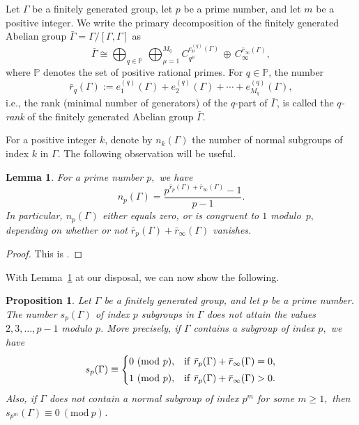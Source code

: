 \documentclass[12pt,reqno]{amsart}
\numberwithin{equation}{section}
\newtheorem{proposition}[theorem]{Proposition}
\newtheorem{lemma}[theorem]{Lemma}
\theoremstyle{remark}
\begin{document}
\medskip
Let $\Gamma$ be a finitely generated group, let $p$
be a prime number, and let $m$ be a positive integer. We write the
primary decomposition of the finitely generated Abelian group
$\bar{\Gamma} = \Gamma/[\Gamma, \Gamma]$ as 
\[
\bar{\Gamma} \cong \bigoplus_{q\in\mathbb{P}}\,
\bigoplus_{\mu=1}^{M_q} C_{q^{\mu}}^{e^{(q)}_{\mu}(\Gamma)}\,
\oplus\, C_\infty^{\bar{r}_\infty(\Gamma)}, 
\]
where $\mathbb{P}$ denotes the set of positive rational primes. For
$q\in\mathbb{P}$, the number 
\[
\bar{r}_q(\Gamma) := e_1^{(q)}(\Gamma) + e_2^{(q)}(\Gamma) + \cdots +
e^{(q)}_{M_q}(\Gamma), 
\]
i.e., the rank (minimal number of generators) of the $q$-part of
$\bar{\Gamma}$, is called the \emph{$q$-rank} of the finitely
generated Abelian group $\bar{\Gamma}$. 

For a positive integer $k$, denote by $n_{k}(\Gamma)$ the number of
normal subgroups of index $k$ in $\Gamma$. The following observation
will be useful. 

\begin{lemma}
\label{Lem:NormalCount}
For a prime number $p,$ we have
\begin{equation}
\label{Eq:NormalpCount}
n_p(\Gamma) = \frac{p^{\bar{r}_p(\Gamma) + \bar{r}_\infty(\Gamma)}-1}{p-1}.
\end{equation}
In particular, $n_p(\Gamma)$ either equals zero, or is congruent to
$1$ modulo~$p,$ depending on whether or not $\bar{r}_p(\Gamma) +
\bar{r}_\infty(\Gamma)$ vanishes. 
\end{lemma}

\begin{proof}
This is \cite[Lemma~2]{MueFor}.
\end{proof}

With Lemma~\ref{Lem:NormalCount} at our disposal, we can now show the
following. 

\begin{proposition}
\label{Prop:FinGenIndexp}
Let\/ $\Gamma$ be a finitely generated group, and let $p$ be a prime number.
The number $s_p(\Gamma)$ of index $p$ subgroups in $\Gamma$ 
does not attain the values $2, 3,
  \ldots, p-1$ modulo $p$. More precisely, if\/ $\Gamma$ contains a
  subgroup of index $p,$ we have 
\begin{equation}
\label{Eq:FinGenIndpCong}
s_p(\Gamma) \equiv \begin{cases} 0~(\mathrm{mod}~p),& 
\text{if\/ }\bar{r}_p(\Gamma) +
  \bar{r}_\infty(\Gamma) = 0,\\[1mm] 
1~(\mathrm{mod}~p),& 
\text{if\/ }\bar{r}_p(\Gamma) + \bar{r}_\infty(\Gamma)
>0.\end{cases}
\end{equation}
Also, if\/ $\Gamma$ does not contain a normal subgroup of
  index $p^m$ for some $m\geq1,$ then 
$s_{p^m}(\Gamma) \equiv 0~(\mathrm{mod}~p)$. 
\end{proposition}
\end{document}
